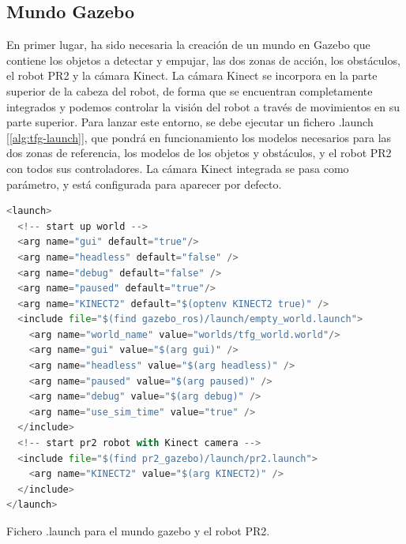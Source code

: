 \documentclass[12pt,spanish,chapterprefix, numbers=noenddot]{book}
\numberwithin{equation}{section}
\numberwithin{figure}{section}
\begin{document}
\subsection{Mundo Gazebo}
En primer lugar, ha sido necesaria la creación de un mundo en Gazebo que contiene los objetos a detectar y empujar, las dos zonas de acción, los obstáculos, el robot PR2 y la cámara Kinect.
La cámara Kinect se incorpora en la parte superior de la cabeza del robot, de forma que se encuentran completamente integrados y podemos controlar la visión del robot a través de movimientos en su parte superior.
Para lanzar este entorno, se debe ejecutar un fichero .launch [\ref{alg:tfg-launch}], que pondrá en funcionamiento los modelos necesarios para las dos zonas de referencia, los modelos de los objetos y obstáculos, y el robot PR2 con todos sus controladores. La cámara Kinect integrada se pasa como parámetro, y está configurada para aparecer por defecto. 
\vspace{20pt}
\begin{algorithm}[htb!]
\begin{lstlisting}[breaklines=true,language=python]
<launch>
  <!-- start up world -->
  <arg name="gui" default="true"/>
  <arg name="headless" default="false" />
  <arg name="debug" default="false" />
  <arg name="paused" default="true"/>
  <arg name="KINECT2" default="$(optenv KINECT2 true)" />
  <include file="$(find gazebo_ros)/launch/empty_world.launch">
    <arg name="world_name" value="worlds/tfg_world.world"/> 
    <arg name="gui" value="$(arg gui)" />
    <arg name="headless" value="$(arg headless)" />
    <arg name="paused" value="$(arg paused)" />
    <arg name="debug" value="$(arg debug)" />
    <arg name="use_sim_time" value="true" />
  </include>
  <!-- start pr2 robot with Kinect camera -->
  <include file="$(find pr2_gazebo)/launch/pr2.launch">
    <arg name="KINECT2" value="$(arg KINECT2)" />
  </include>
</launch>
\end{lstlisting}

\caption{\label{alg:tfg-launch}Fichero .launch para el mundo gazebo y el robot PR2.}
\end{algorithm}
\end{document}
